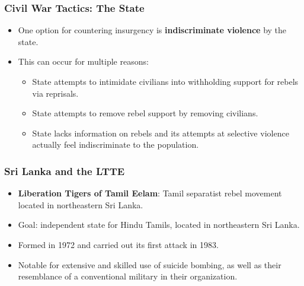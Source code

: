 \documentclass[handout]{beamer}
\begin{document}
\begin{frame} 
	\frametitle{\LARGE{Civil War Tactics: The State}}
	\begin{itemize}
		\item One option for countering insurgency is \textbf{indiscriminate violence} by the state. \pause 
		\item This can occur for multiple reasons: \pause
		\begin{itemize}
			\item State attempts to intimidate civilians into withholding support for rebels via reprisals. \pause
			\item State attempts to remove rebel support by removing civilians. \pause
			\item State lacks information on rebels and its attempts at selective violence actually feel indiscriminate to the population.
		\end{itemize}
	\end{itemize}
\end{frame}

\begin{frame} 
	\frametitle{\LARGE{Sri Lanka and the LTTE}}
	\begin{itemize}
		\item \textbf{Liberation Tigers of Tamil Eelam}: Tamil separatist rebel movement located in northeastern Sri Lanka. \pause
		\item Goal: independent state for Hindu Tamils, located in northeastern Sri Lanka. \pause
		\item Formed in 1972 and carried out its first attack in 1983. \pause
		\item Notable for extensive and skilled use of suicide bombing, as well as their resemblance of a conventional military in their organization.
	\end{itemize}
\end{frame}
\end{document}
